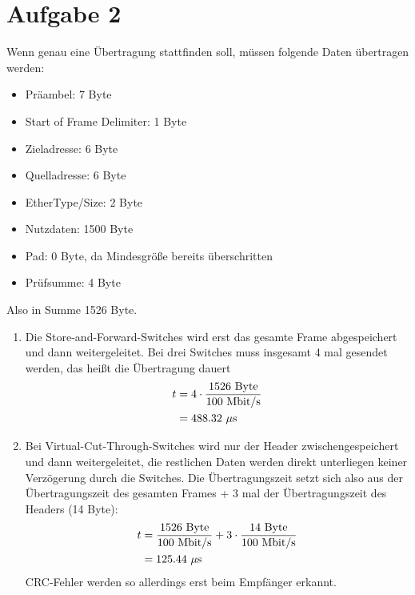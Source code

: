 \documentclass{article}
\begin{document}
	\section*{Aufgabe 2}
	Wenn genau eine Übertragung stattfinden soll, müssen folgende Daten übertragen werden:
	\begin{itemize}
		\item Präambel: 7 Byte
		\item Start of Frame Delimiter: 1 Byte
		\item Zieladresse: 6 Byte
		\item Quelladresse: 6 Byte
		\item EtherType/Size: 2 Byte
		\item Nutzdaten: 1500 Byte
		\item Pad: 0 Byte, da Mindesgröße bereits überschritten
		\item Prüfsumme: 4 Byte
	\end{itemize} 
	Also in Summe 1526 Byte.
	\begin{enumerate}[label=(\alph*)]
		\item Die Store-and-Forward-Switches wird erst das gesamte Frame abgespeichert und dann weitergeleitet. Bei drei Switches muss insgesamt 4 mal gesendet werden, das heißt die Übertragung dauert
		\begin{align}
			t &= 4\cdot \frac{1526\text{ Byte}}{100 \text{ Mbit/s}} \notag \\
			&= 488.32 \text{ $\mu$s} \notag
		\end{align}
		\item Bei Virtual-Cut-Through-Switches wird nur der Header zwischengespeichert und dann weitergeleitet, die restlichen Daten werden direkt unterliegen keiner Verzögerung durch die Switches. Die Übertragungszeit setzt sich also aus der Übertragungszeit des gesamten Frames + 3 mal der Übertragungszeit des Headers (14 Byte):
		\begin{align}
			t &= \frac{1526\text{ Byte}}{100 \text{ Mbit/s}} + 3\cdot \frac{14\text{ Byte}}{100 \text{ Mbit/s}} \notag \\
			&= 125.44 \text{ $\mu$s} \notag
		\end{align}
		CRC-Fehler werden so allerdings erst beim Empfänger erkannt.
	\end{enumerate}
\end{document}
